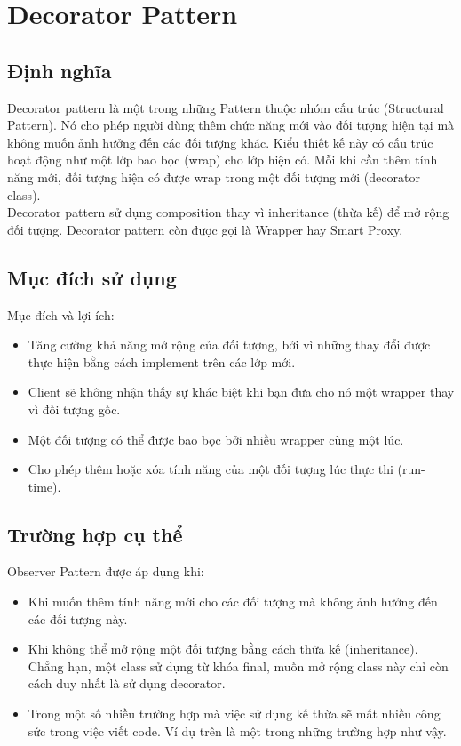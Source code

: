 \chapter{Decorator Pattern}

\section{Định nghĩa}
Decorator pattern là một trong những Pattern thuộc nhóm cấu trúc (Structural Pattern). Nó cho phép người dùng thêm chức năng mới vào đối tượng hiện tại mà không muốn ảnh hưởng đến các đối tượng khác. Kiểu thiết kế này có cấu trúc hoạt động như một lớp bao bọc (wrap) cho lớp hiện có. Mỗi khi cần thêm tính năng mới, đối tượng hiện có được wrap trong một đối tượng mới (decorator class).\\

Decorator pattern sử dụng composition thay vì inheritance (thừa kế) để mở rộng đối tượng. Decorator pattern còn được gọi là Wrapper hay Smart Proxy.

\section{Mục đích sử dụng}
Mục đích và lợi ích:
\begin{itemize}
	\item Tăng cường khả năng mở rộng của đối tượng, bởi vì những thay đổi được thực hiện bằng cách implement trên các lớp mới.
	\item Client sẽ không nhận thấy sự khác biệt khi bạn đưa cho nó một wrapper thay vì đối tượng gốc.
	\item Một đối tượng có thể được bao bọc bởi nhiều wrapper cùng một lúc.
	\item Cho phép thêm hoặc xóa tính năng của một đối tượng lúc thực thi (run-time).
\end{itemize}
\section{Trường hợp cụ thể}
Observer Pattern được áp dụng khi:

\begin{itemize}
	\item Khi muốn thêm tính năng mới cho các đối tượng mà không ảnh hưởng đến các đối tượng này.
	\item Khi không thể mở rộng một đối tượng bằng cách thừa kế (inheritance). Chẳng hạn, một class sử dụng từ khóa final, muốn mở rộng class này chỉ còn cách duy nhất là sử dụng decorator.
	\item Trong một số nhiều trường hợp mà việc sử dụng kế thừa sẽ mất nhiều công sức trong việc viết code. Ví dụ trên là một trong những trường hợp như vậy.
\end{itemize}
